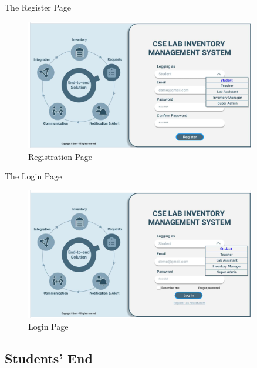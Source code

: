 \documentclass[20pt]{beamer}
\numberwithin{figure}{section}
\begin{document}
\begin{frame}{The Register Page}

     \begin{figure}
        \centering
        \includegraphics[width= 0.9\textwidth , height= 0.5\paperheight]{RegisterUI.png}
        \caption{Registration Page}
        \label{fig:50}
    \end{figure}

\end{frame}

\begin{frame}{The Login Page}

     \begin{figure}
        \centering
        \includegraphics[width= 0.9\textwidth , height= 0.5\paperheight]{LoginUI.png}
        \caption{Login Page}
        \label{fig:51}
    \end{figure}

\end{frame}

\subsection{Students' End}
\end{document}

